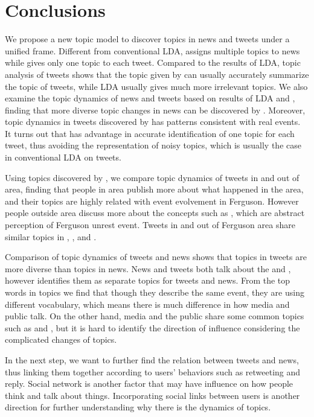 \section{Conclusions}
\label{sec:conclu}

We propose a new topic model \stlda to discover topics in news and tweets under a unified frame. Different from conventional LDA, \stlda assigns multiple topics to news while gives only one topic to each tweet. Compared to the results of LDA, topic analysis of tweets shows that the topic given by \stlda can usually accurately summarize the topic of tweets, while LDA usually gives much more irrelevant topics. We also examine the topic dynamics of news and tweets based on results of LDA and \stlda, finding that more diverse topic changes in news can be discovered by \stlda. Moreover, topic dynamics in tweets discovered by \stlda has patterns consistent with real events. It turns out that \stlda has advantage in accurate identification of one topic for each tweet, thus avoiding the representation of noisy topics, which is usually the case in conventional LDA on tweets.

Using topics discovered by \stlda, we compare topic dynamics of tweets in and out of \stlouis area, finding that people in \stlouis area publish more about what happened in the area, and their topics are highly related with event evolvement in Ferguson. However people outside \stlouis area discuss more about the concepts such as \racism, which are abstract perception of Ferguson unrest event. Tweets in and out of Ferguson area share similar topics in \newsreport, \curfew, \shootincident and \michaelbrown.

Comparison of topic dynamics of tweets and news shows that topics in tweets are more diverse than topics in news. News and tweets both talk about the \shootincident and \racism, however \stlda identifies them as separate topics for tweets and news. From the top words in topics we find that though they describe the same event, they are using different vocabulary, which means there is much difference in how media and public talk. On the other hand, media and the public share some common topics such as \protest and \newsreport, but it is hard to identify the direction of influence considering the complicated changes of topics.

In the next step, we want to further find the relation between tweets and news, thus linking them together according to users' behaviors such as retweeting and reply. Social network is another factor that may have influence on how people think and talk about things. Incorporating social links between users is another direction for further understanding why there is the dynamics of topics.

